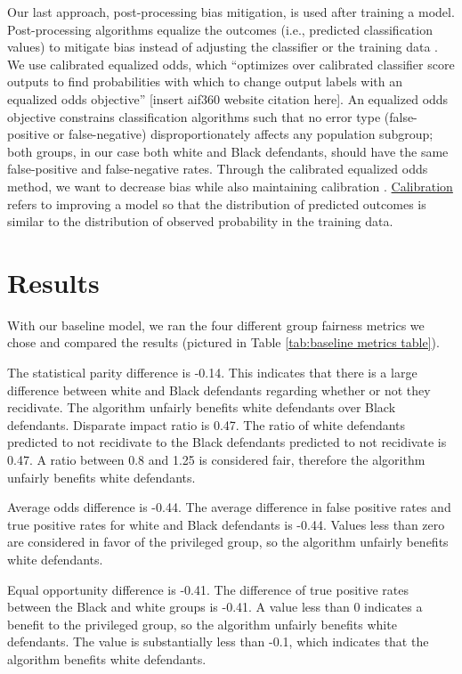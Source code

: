 \documentclass[water,article,submit,moreauthors,pdftex]{mdpi}
\begin{document}
Our last approach, post-processing bias mitigation, is used after
training a model. Post-processing algorithms equalize the outcomes
(i.e., predicted classification values) to mitigate bias instead of
adjusting the classifier or the training data \citep{baxter2021AI}. We
use calibrated equalized odds, which ``optimizes over calibrated
classifier score outputs to find probabilities with which to change
output labels with an equalized odds objective'' {[}insert aif360
website citation here{]}. An equalized odds objective constrains
classification algorithms such that no error type (false-positive or
false-negative) disproportionately affects any population subgroup; both
groups, in our case both white and Black defendants, should have the
same false-positive and false-negative rates. Through the calibrated
equalized odds method, we want to decrease bias while also maintaining
calibration \citep{pleiss2017fairness}.
\href{https://medium.com/analytics-vidhya/calibration-in-machine-learning-e7972ac93555}{Calibration}
refers to improving a model so that the distribution of predicted
outcomes is similar to the distribution of observed probability in the
training data.

\hypertarget{results}{%
\section{Results}\label{results}}

With our baseline model, we ran the four different group fairness
metrics we chose and compared the results (pictured in Table
\ref{tab:baseline metrics table}).

The statistical parity difference is -0.14. This indicates that there is
a large difference between white and Black defendants regarding whether
or not they recidivate. The algorithm unfairly benefits white defendants
over Black defendants. Disparate impact ratio is 0.47. The ratio of
white defendants predicted to not recidivate to the Black defendants
predicted to not recidivate is 0.47. A ratio between 0.8 and 1.25 is
considered fair, therefore the algorithm unfairly benefits white
defendants.

Average odds difference is -0.44. The average difference in false
positive rates and true positive rates for white and Black defendants is
-0.44. Values less than zero are considered in favor of the privileged
group, so the algorithm unfairly benefits white defendants.

Equal opportunity difference is -0.41. The difference of true positive
rates between the Black and white groups is -0.41. A value less than 0
indicates a benefit to the privileged group, so the algorithm unfairly
benefits white defendants. The value is substantially less than -0.1,
which indicates that the algorithm benefits white defendants.
\end{document}
